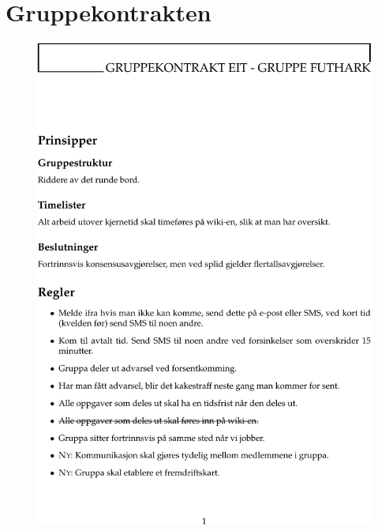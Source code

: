 \appendix
\chapter{Gruppekontrakten}
\label{avs:kontrakt}
\pagestyle{empty}
\begin{figure}[p]
    \includegraphics[width=\textwidth]{EiTkontrakt-p1.pdf}
\end{figure}
